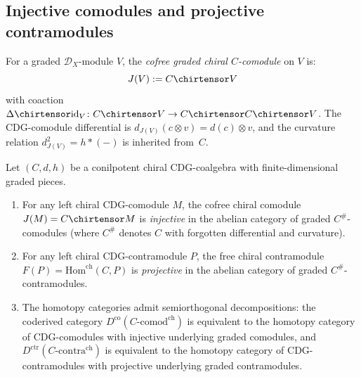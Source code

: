 \subsection{Injective comodules and projective contramodules}
\label{subsec:chiral-inj-proj}

\begin{definition}
\label{def:cofree-chiral-comod}
For a graded $\mathcal{D}_X$-module $V$, the \emph{cofree graded
chiral $C$-comodule} on $V$ is:
\[
J(V) := C \chirtensor V
\]
with coaction $\Delta \chirtensor \mathrm{id}_V\colon
C \chirtensor V \to C \chirtensor C \chirtensor V$.
The CDG-comodule differential is
$d_{J(V)}(c \otimes v) = d(c) \otimes v$,
and the curvature relation $d_{J(V)}^2 = h \ast (-)$ is inherited
from~$C$.
\end{definition}

\begin{proposition}\label{prop:chiral-inj-proj-resolutions}
Let $(C, d, h)$ be a conilpotent chiral CDG-coalgebra with
finite-dimensional graded pieces.
\begin{enumerate}[label=\textup{(\alph*)}]
\item For any left chiral CDG-comodule $M$, the cofree chiral
 comodule $J(M) = C \chirtensor M$ is \emph{injective} in the
 abelian category of graded $C^{\#}$-comodules (where $C^{\#}$
 denotes $C$ with forgotten differential and curvature).
\item For any left chiral CDG-contramodule $P$, the free chiral
 contramodule $F(P) = \mathrm{Hom}^{\mathrm{ch}}(C, P)$ is
 \emph{projective} in the abelian category of graded
 $C^{\#}$-contramodules.
\item The homotopy categories admit semiorthogonal decompositions:
 the coderived category $D^{\mathrm{co}}(C\text{-}\mathrm{comod}^{\mathrm{ch}})$
 is equivalent to the homotopy category of CDG-comodules
 with injective underlying graded comodules, and
 $D^{\mathrm{ctr}}(C\text{-}\mathrm{contra}^{\mathrm{ch}})$
 is equivalent to the homotopy category of CDG-contramodules
 with projective underlying graded contramodules.
\end{enumerate}
\end{proposition}

